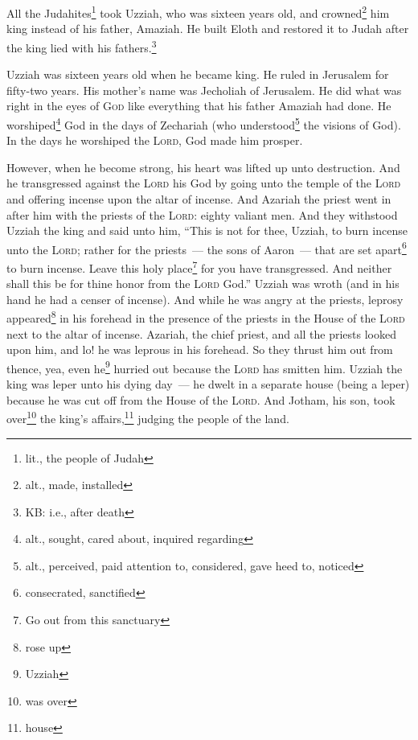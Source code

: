 
\begin{inparaenum}
     All the Judahites\footnote{lit., the people of Judah} took Uzziah, who was sixteen years old, and crowned\footnote{alt., made, installed} him king instead of his father, Amaziah.%
     He built Eloth and restored it to Judah after the king lied with his fathers.\footnote{KB: i.e., after death}%
    
     Uzziah was sixteen years old when he became king. He ruled in Jerusalem for fifty-two years. His mother's name was Jecholiah of Jerusalem.%
     He did what was right in the eyes of \textsc{God} like everything that his father Amaziah had done.%
     He worshiped\footnote{alt., sought, cared about, inquired regarding} God in the days of Zechariah (who understood\footnote{alt., perceived, paid attention to, considered, gave heed to, noticed} the visions of God). In the days he worshiped the \textsc{Lord}, God made him prosper.%
    
    
     However, when he become strong, his heart was lifted up unto destruction. And he transgressed against the \textsc{Lord} his God by going unto the temple of the \textsc{Lord} and offering incense upon the altar of incense.%
     And Azariah the priest went in after him with the priests of the \textsc{Lord}: eighty valiant men.%
     And they withstood Uzziah the king and said unto him, ``This is not for thee, Uzziah, to burn incense unto the \textsc{Lord}; rather for the priests~--- the sons of Aaron~--- that are set apart\footnote{consecrated, sanctified} to burn incense. Leave this holy place\footnote{Go out from this sanctuary} for you have transgressed. And neither shall this be for thine honor from the \textsc{Lord} God.''%
     Uzziah was wroth (and in his hand he had a censer of incense). And while he was angry at the priests, leprosy appeared\footnote{rose up} in his forehead in the presence of the priests in the House of the \textsc{Lord} next to the altar of incense.%
     Azariah, the chief priest, and all the priests looked upon him, and lo! he was leprous in his forehead. So they thrust him out from thence, yea, even he\footnote{Uzziah} hurried out because the \textsc{Lord} has smitten him.%
     Uzziah the king was leper unto his dying day~--- he dwelt in a separate house (being a leper) because he was cut off from the House of the \textsc{Lord}. And Jotham, his son, took over\footnote{was over} the king's affairs,\footnote{house} judging the people of the land.%
\end{inparaenum}
